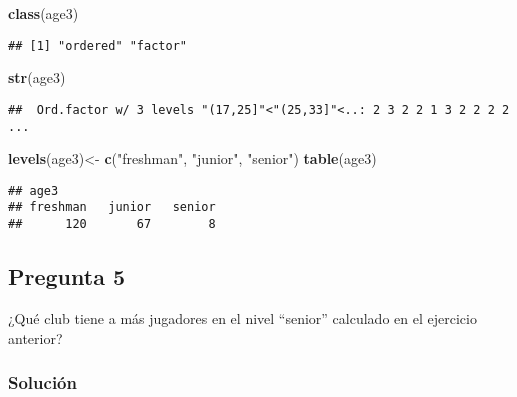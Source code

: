 \documentclass[
]{article}
\newenvironment{Shaded}{\begin{snugshade}}{\end{snugshade}}
\newcommand{\KeywordTok}[1]{\textcolor[rgb]{0.13,0.29,0.53}{\textbf{#1}}}
\newcommand{\NormalTok}[1]{#1}
\newcommand{\OperatorTok}[1]{\textcolor[rgb]{0.81,0.36,0.00}{\textbf{#1}}}
\newcommand{\StringTok}[1]{\textcolor[rgb]{0.31,0.60,0.02}{#1}}
\begin{document}
\begin{Shaded}
\begin{Highlighting}[]
\KeywordTok{class}\NormalTok{(age3)}
\end{Highlighting}
\end{Shaded}

\begin{verbatim}
## [1] "ordered" "factor"
\end{verbatim}

\begin{Shaded}
\begin{Highlighting}[]
\KeywordTok{str}\NormalTok{(age3)}
\end{Highlighting}
\end{Shaded}

\begin{verbatim}
##  Ord.factor w/ 3 levels "(17,25]"<"(25,33]"<..: 2 3 2 2 1 3 2 2 2 2 ...
\end{verbatim}

\begin{Shaded}
\begin{Highlighting}[]
\KeywordTok{levels}\NormalTok{(age3)<-}\StringTok{ }\KeywordTok{c}\NormalTok{(}\StringTok{"freshman"}\NormalTok{, }\StringTok{"junior"}\NormalTok{, }\StringTok{"senior"}\NormalTok{)}
\KeywordTok{table}\NormalTok{(age3)}
\end{Highlighting}
\end{Shaded}

\begin{verbatim}
## age3
## freshman   junior   senior 
##      120       67        8
\end{verbatim}

\hypertarget{pregunta-5}{%
\subsection{Pregunta 5}\label{pregunta-5}}

¿Qué club tiene a más jugadores en el nivel ``senior'' calculado en el
ejercicio anterior?

\hypertarget{soluciuxf3n-5}{%
\subsubsection{Solución}\label{soluciuxf3n-5}}

\begin{Shaded}
\end{Shaded}
\end{document}

